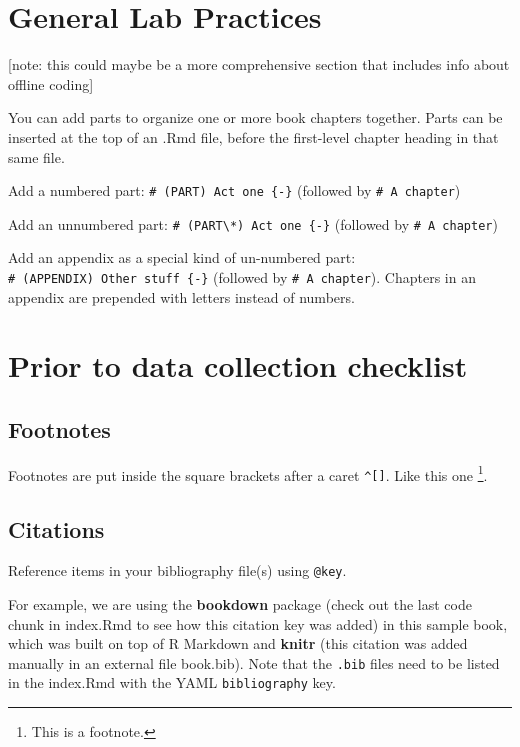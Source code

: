 \documentclass[
]{book}
\theoremstyle{definition}
\theoremstyle{definition}
\theoremstyle{definition}
\theoremstyle{definition}
\theoremstyle{remark}
\begin{document}
\hypertarget{general-lab-practices}{%
\chapter{General Lab Practices}\label{general-lab-practices}}

{[}note: this could maybe be a more comprehensive section that includes info about offline coding{]}

You can add parts to organize one or more book chapters together. Parts can be inserted at the top of an .Rmd file, before the first-level chapter heading in that same file.

Add a numbered part: \texttt{\#\ (PART)\ Act\ one\ \{-\}} (followed by \texttt{\#\ A\ chapter})

Add an unnumbered part: \texttt{\#\ (PART\textbackslash{}*)\ Act\ one\ \{-\}} (followed by \texttt{\#\ A\ chapter})

Add an appendix as a special kind of un-numbered part: \texttt{\#\ (APPENDIX)\ Other\ stuff\ \{-\}} (followed by \texttt{\#\ A\ chapter}). Chapters in an appendix are prepended with letters instead of numbers.

\hypertarget{prior-to-data-collection-checklist}{%
\chapter{Prior to data collection checklist}\label{prior-to-data-collection-checklist}}

\hypertarget{footnotes}{%
\section{Footnotes}\label{footnotes}}

Footnotes are put inside the square brackets after a caret \texttt{\^{}{[}{]}}. Like this one \footnote{This is a footnote.}.

\hypertarget{citations}{%
\section{Citations}\label{citations}}

Reference items in your bibliography file(s) using \texttt{@key}.

For example, we are using the \textbf{bookdown} package \citep{R-bookdown} (check out the last code chunk in index.Rmd to see how this citation key was added) in this sample book, which was built on top of R Markdown and \textbf{knitr} \citep{xie2015} (this citation was added manually in an external file book.bib).
Note that the \texttt{.bib} files need to be listed in the index.Rmd with the YAML \texttt{bibliography} key.
\end{document}
